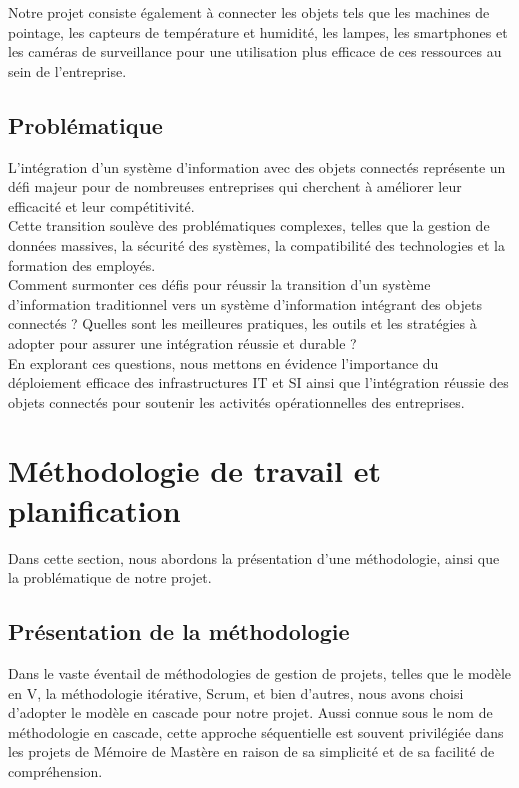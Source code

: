 Notre projet consiste également à connecter les objets tels que les machines de pointage, les capteurs de température et humidité, les lampes, les smartphones et les caméras de surveillance pour une utilisation plus efficace de ces ressources au sein de l'entreprise.\\

\subsection{Problématique}
L'intégration d'un système d'information avec des objets connectés représente un défi majeur pour de nombreuses entreprises qui cherchent à améliorer leur efficacité et leur compétitivité.\\

Cette transition soulève des problématiques complexes, telles que la gestion de données massives, la sécurité des systèmes, la compatibilité des technologies et la formation des employés.\\

Comment surmonter ces défis pour réussir la transition d'un système d'information traditionnel vers un système d'information intégrant des objets connectés ? Quelles sont les meilleures pratiques, les outils et les stratégies à adopter pour assurer une intégration réussie et durable ? \\

En explorant ces questions, nous mettons en évidence l'importance du déploiement efficace des infrastructures IT et SI ainsi que l'intégration réussie des objets connectés pour soutenir les activités opérationnelles des entreprises.



\section{Méthodologie de travail et planification}

Dans cette section, nous abordons la présentation d'une méthodologie, ainsi que la problématique de notre projet.


\subsection{Présentation de la méthodologie}

Dans le vaste éventail de méthodologies de gestion de projets, telles que le modèle en V, la méthodologie itérative, Scrum, et bien d'autres, nous avons choisi d'adopter le modèle en cascade pour notre projet. Aussi connue sous le nom de méthodologie en cascade, cette approche séquentielle est souvent privilégiée dans les projets de Mémoire de Mastère en raison de sa simplicité et de sa facilité de compréhension.

